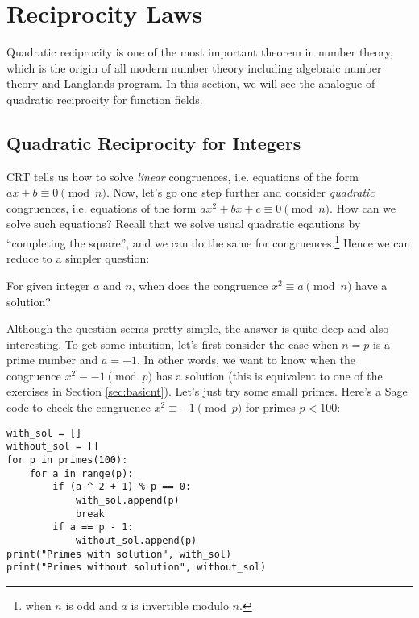 \section{Reciprocity Laws}
\label{sec:reciprocity}

Quadratic reciprocity is one of the most important theorem in number theory, which is the origin of all modern number theory including algebraic number theory and Langlands program.
In this section, we will see the analogue of quadratic reciprocity for function fields.

\subsection{Quadratic Reciprocity for Integers}
\label{subsec:quadratic-reciprocity}

CRT tells us how to solve \emph{linear} congruences, i.e. equations of the form $ax + b \equiv 0 \pmod{n}$.
Now, let's go one step further and consider \emph{quadratic} congruences, i.e. equations of the form $a x^2 + bx + c\equiv 0 \pmod{n}$.
How can we solve such equations?
Recall that we solve usual quadratic eqautions by ``completing the square'', and we can do the same for congruences.\footnote{when $n$ is odd and $a$ is invertible modulo $n$.}
Hence we can reduce to a simpler question:

\begin{myquote}
For given integer $a$ and $n$, when does the congruence $x^2 \equiv a \pmod{n}$ have a solution?
\end{myquote}

Although the question seems pretty simple, the answer is quite deep and also interesting.
To get some intuition, let's first consider the case when $n = p$ is a prime number and $a = -1$.
In other words, we want to know when the congruence $x^2 \equiv -1 \pmod{p}$ has a solution (this is equivalent to one of the exercises in Section \ref{sec:basicnt}).
Let's just try some small primes.
Here's a Sage code to check the congruence $x^2 \equiv -1 \pmod{p}$ for primes $p < 100$:

\begin{verbatim}
with_sol = []
without_sol = []
for p in primes(100):
    for a in range(p):
        if (a ^ 2 + 1) % p == 0:
            with_sol.append(p)
            break
        if a == p - 1:
            without_sol.append(p)
print("Primes with solution", with_sol)
print("Primes without solution", without_sol)
\end{verbatim}


